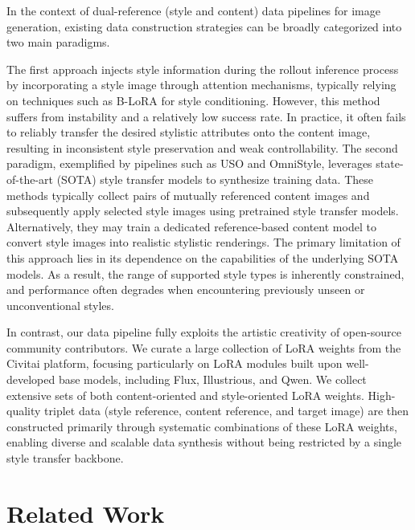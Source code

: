 \documentclass[runningheads]{llncs}
\begin{document}


In the context of dual-reference (style and content) data pipelines for image generation, existing data construction strategies can be broadly categorized into two main paradigms.


The first approach injects style information during the rollout inference process by incorporating a style image through attention mechanisms, typically relying on techniques such as B-LoRA for style conditioning. However, this method suffers from instability and a relatively low success rate. In practice, it often fails to reliably transfer the desired stylistic attributes onto the content image, resulting in inconsistent style preservation and weak controllability.
The second paradigm, exemplified by pipelines such as USO and OmniStyle, leverages state-of-the-art (SOTA) style transfer models to synthesize training data. These methods typically collect pairs of mutually referenced content images and subsequently apply selected style images using pretrained style transfer models. Alternatively, they may train a dedicated reference-based content model to convert style images into realistic stylistic renderings. The primary limitation of this approach lies in its dependence on the capabilities of the underlying SOTA models. As a result, the range of supported style types is inherently constrained, and performance often degrades when encountering previously unseen or unconventional styles.


In contrast, our data pipeline fully exploits the artistic creativity of open-source community contributors. We curate a large collection of LoRA weights from the Civitai platform, focusing particularly on LoRA modules built upon well-developed base models, including Flux, Illustrious, and Qwen. We collect extensive sets of both content-oriented and style-oriented LoRA weights. High-quality triplet data (style reference, content reference, and target image) are then constructed primarily through systematic combinations of these LoRA weights, enabling diverse and scalable data synthesis without being restricted by a single style transfer backbone.

\section{Related Work}
\end{document}
